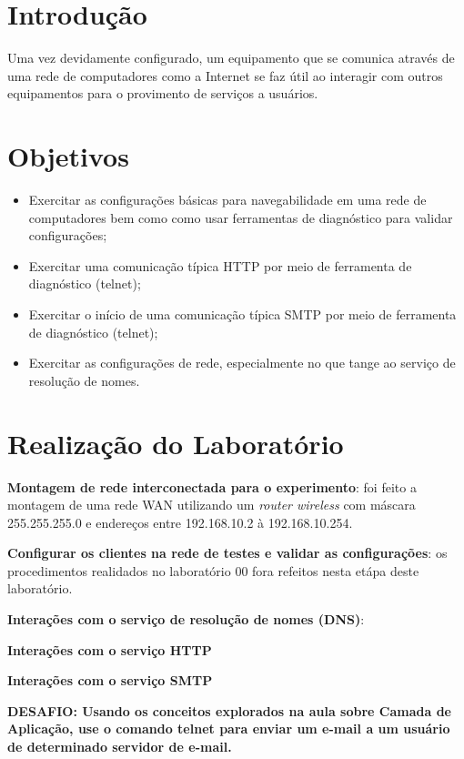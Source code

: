 \section{Introdução}

Uma vez devidamente configurado, um equipamento que se comunica através de uma rede de
computadores como a Internet se faz útil ao interagir com outros equipamentos para o provimento
de serviços a usuários.

\section{Objetivos}

\begin{itemize}
  \item Exercitar as configurações básicas para navegabilidade em uma rede de computadores bem como
    como usar ferramentas de diagnóstico para validar configurações;
  \item Exercitar uma comunicação típica HTTP por meio de ferramenta de diagnóstico (telnet);
  \item Exercitar o início de uma comunicação típica SMTP por meio de ferramenta de diagnóstico
    (telnet);
  \item Exercitar as configurações de rede, especialmente no que tange ao serviço de resolução de
    nomes.
\end{itemize}

\section{Realização do Laboratório}

\textbf{Montagem de rede interconectada para o experimento}: foi feito a montagem de uma rede WAN utilizando
um \textit{router wireless} com máscara 255.255.255.0 e endereços entre 192.168.10.2 à 192.168.10.254.

\textbf{Configurar os clientes na rede de testes e validar as configurações}: os procedimentos realidados no
laboratório 00 fora refeitos nesta etápa deste laboratório.

\textbf{Interações com o serviço de resolução de nomes (DNS)}:

\textbf{Interações com o serviço HTTP}

\textbf{Interações com o serviço SMTP}

\textbf{DESAFIO: Usando os conceitos explorados na aula sobre Camada de Aplicação, use o comando
telnet para enviar um e-mail a um usuário de determinado servidor de e-mail.}

